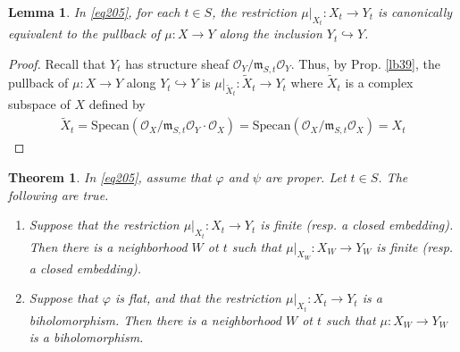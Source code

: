 \documentclass[12pt,b5paper,notitlepage]{report}
\theoremstyle{definition}
\theoremstyle{plain}
\newtheorem{thm}[df]{Theorem}
\newtheorem{lm}[df]{Lemma}
\newcommand{\wtd}{\widetilde}
\newcommand{\scr}{\mathscr}
\newcommand{\Specan}{\mathrm{Specan}}
\newcommand{\mk}{\mathfrak m}
\numberwithin{equation}{section}
\begin{document}
\begin{lm}\label{lb395}
In \eqref{eq205}, for each $t\in S$, the restriction $\mu|_{X_t}:X_t\rightarrow Y_t$ is canonically equivalent to the pullback of $\mu:X\rightarrow Y$ along the inclusion $Y_t\hookrightarrow Y$.
\end{lm}


\begin{proof}
Recall that $Y_t$ has structure sheaf $\scr O_Y/\mk_{S,t}\scr O_Y$. Thus, by Prop. \ref{lb39}, the pullback of $\mu:X\rightarrow Y$ along $Y_t\hookrightarrow Y$ is $\mu|_{\wtd X_t}:\wtd X_t\rightarrow Y_t$ where $\wtd X_t$ is a complex subspace of $X$ defined by
\begin{align*}
\wtd X_t=\Specan(\scr O_X/\mk_{S,t}\scr O_Y\cdot\scr O_X)=\Specan(\scr O_X/\mk_{S,t}\scr O_X)=X_t
\end{align*}
\end{proof}


\begin{thm}\label{lb396}
In \eqref{eq205}, assume that $\varphi$ and $\psi$ are proper. Let $t\in S$. The following are true.
\begin{enumerate}
\item Suppose that the restriction $\mu|_{X_t}:X_t\rightarrow Y_t$ is finite (resp. a closed embedding). Then there is a neighborhood $W$ ot $t$ such that $\mu|_{X_W}:X_W\rightarrow Y_W$ is finite (resp. a closed embedding). 
\item Suppose that $\varphi$ is flat, and that the restriction  $\mu|_{X_t}:X_t\rightarrow Y_t$ is a biholomorphism. Then there is a neighborhood $W$ ot $t$ such that $\mu:X_W\rightarrow Y_W$ is a biholomorphism.
\end{enumerate}
\end{thm}
\end{document}
